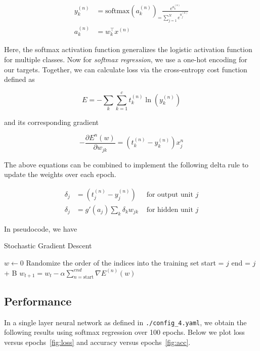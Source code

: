 \begin{equation*}
	\begin{aligned}
		y^{(n)}_k & = \text{softmax}(a^{(n)}_k)_ =
		\frac{e^{a^{(n)}_k}}{\sum_{j=1}^{N} e^{a^{(n)}_j}} \\
		a^{(n)}_k & = w^\top_k x^{(n)}
	\end{aligned}
\end{equation*}

Here, the softmax activation function generalizes the logistic activation
function for multiple classes. Now for \textit{softmax regression}, we use a
one-hot encoding for our targets. Together, we can calculate loss via the
cross-entropy cost function defined as

\begin{equation*}
	E = - \sum_k \sum_{k = 1}^c t^{(n)}_k \ln \left( y^{(n)}_k \right)
\end{equation*}

and its corresponding gradient

\begin{equation*}
	-\frac{\partial E^n(w)}{\partial w_{j k}}=\left(t_k^{(n)}-y_k^{(n)}\right) x_j^n
\end{equation*}

The above equations can be combined to implement the following delta rule to
update the weights over each epoch.

\begin{equation*}
	\begin{aligned}
		\delta_j & = (t_j^{(n)}-y_j^{(n)})         & \text{ for output unit } j \\
		\delta_j & = g'(a_j)\sum_k \delta_k w_{jk} & \text{ for hidden unit } j
	\end{aligned}
\end{equation*}

In pseudocode, we have

\begin{algorithm}
	\caption{Stochastic Gradient Descent}
	\begin{algorithmic}
		\State $w \gets 0$
		\State Randomize the order of the indices into the training set
		\State start = $j$
		\State end = $j$ + B
		\State $w_{t + 1} = w_t - \alpha \sum_{n = \text{start}}^{end} \nabla
			E^{(n)}(w) $
		\EndFor
		\EndFor
	\end{algorithmic}
\end{algorithm}

\subsection{Performance}

In a single layer neural network as defined in \texttt{./config\_4.yaml}, we
obtain the following results using softmax regression over 100 epochs. Below we
plot loss versus epochs~\cref{fig:loss} and accuracy versus epochs~\cref{fig:acc}.
